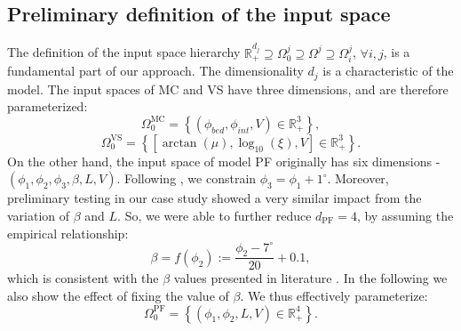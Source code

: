 \documentclass[nhess, manuscript]{copernicus}
\begin{document}
\subsection{Preliminary definition of the input space}\label{sub2.1}
The definition of the input space hierarchy $\mathbb R_+^{d_j}\supseteq\Omega_0^j\supseteq\Omega^j\supseteq\Omega^j_i$, $\forall i,j$, is a fundamental part of our approach. The dimensionality $d_j$ is a characteristic of the model. The input spaces of MC and VS have three dimensions, and are therefore parameterized:
$$\Omega_0^{\mathrm{MC}} = \left\{(\phi_{bed}, \phi_{int}, V)\in \mathbb R_+^3\right\},$$
$$\Omega_0^{\mathrm{VS}} = \left\{\left[\arctan(\mu),\log_{10}(\xi),V\right]\in \mathbb R_+^3\right\}.$$
On the other hand, the input space of model PF originally has six dimensions - $(\phi_1, \phi_2, \phi_3, \beta, L, V)$. Following \cite{PouliquenForterre2002}, we constrain $\phi_3=\phi_1+1^\mathrm{\circ}$. Moreover, preliminary testing in our case study showed a very similar impact from the variation of $\beta$ and $L$. So, we were able to further reduce $d_{\mathrm{PF}}=4$, by assuming the empirical relationship:
\begin{equation}
\beta=f(\phi_2):=\frac{\phi_2 - 7^\circ}{20} + 0.1,
\end{equation}
which is  consistent with the $\beta$ values presented in literature \citep{PouliquenForterre2002, ForterrePouliquen2003}. In the following we also show the effect of fixing the value of $\beta$. We thus effectively parameterize:
$$\Omega_0^{\mathrm{PF}} = \left\{(\phi_1, \phi_2, L, V)\in \mathbb R_+^4\right\}.$$
\end{document}
